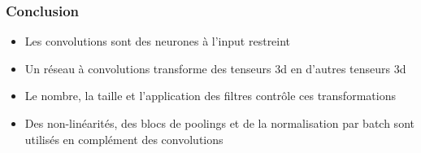 \documentclass{formation}
\begin{document}
\begin{frame}
  \frametitle{Conclusion}
  \begin{itemize}
  \item Les convolutions sont des neurones à l'input restreint
  \item Un réseau à convolutions transforme des tenseurs 3d en
    d'autres tenseurs 3d
  \item Le nombre, la taille et l'application des filtres contrôle ces
    transformations
  \item Des non-linéarités, des blocs de poolings et de la
    normalisation par batch sont utilisés en complément des convolutions
  \end{itemize}
\end{frame}

\begin{frame}[allowframebreaks]
  
\end{frame}
\end{document}
